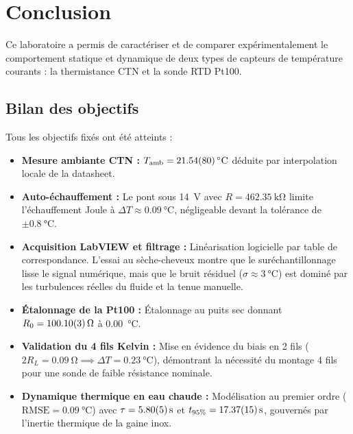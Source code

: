 \chapter{Conclusion}
\label{chap:conclusion}

Ce laboratoire a permis de caractériser et de comparer expérimentalement le comportement statique et dynamique de deux types de capteurs de température courants : la thermistance CTN et la sonde RTD Pt100.

\section{Bilan des objectifs}
\label{sec:conclusion_objectifs}

Tous les objectifs fixés ont été atteints :
\begin{itemize}[leftmargin=1.2cm]
    \item \textbf{Mesure ambiante CTN :} $T_{\text{amb}} = \qty{21.54 \pm 0.80}{\degreeCelsius}$ déduite par interpolation locale de la datasheet.
    \item \textbf{Auto-échauffement :} Le pont sous \qty{14}{\volt} avec $R = \qty{462.35}{\kilo\ohm}$ limite l'échauffement Joule à $\Delta T \approx \qty{0.09}{\degreeCelsius}$, négligeable devant la tolérance de $\pm \qty{0.8}{\degreeCelsius}$.
    \item \textbf{Acquisition LabVIEW et filtrage :} Linéarisation logicielle par table de correspondance. L'essai au sèche-cheveux montre que le suréchantillonnage lisse le signal numérique, mais que le bruit résiduel ($\sigma \approx \qty{3}{\degreeCelsius}$) est dominé par les turbulences réelles du fluide et la tenue manuelle.
    \item \textbf{Étalonnage de la Pt100 :} Étalonnage au puits sec donnant $R_0 = \qty{100.10 \pm 0.03}{\ohm}$ à \qty{0.00}{\degreeCelsius}.
    \item \textbf{Validation du 4 fils Kelvin :} Mise en évidence du biais en 2 fils ($2 R_L = \qty{0.09}{\ohm} \implies \Delta T = \qty{+0.23}{\degreeCelsius}$), démontrant la nécessité du montage 4 fils pour une sonde de faible résistance nominale.
    \item \textbf{Dynamique thermique en eau chaude :} Modélisation au premier ordre ($\text{RMSE} = \qty{0.09}{\degreeCelsius}$) avec $\tau = \qty{5.80 \pm 0.05}{\second}$ et $t_{95\%} = \qty{17.37 \pm 0.15}{\second}$, gouvernés par l'inertie thermique de la gaine inox.
\end{itemize}

